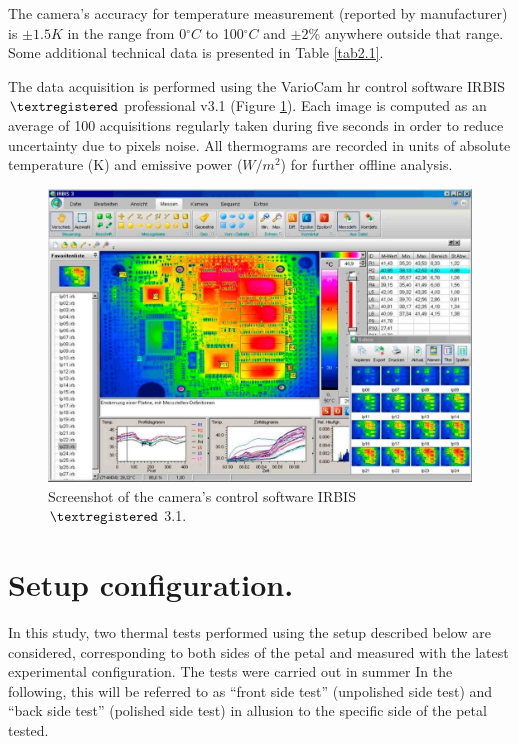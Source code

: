 		The camera’s accuracy for temperature measurement (reported by manufacturer) is $\pm 1.5 K$ in the range from 0\space$^\circ C$ to 100\space$^\circ C$ and $\pm2$\% anywhere outside that range. Some additional technical data is presented in Table \ref{tab2.1}.
		
		The data acquisition is performed using the VarioCam hr control software IRBIS $\textregistered$ professional v3.1 (Figure \ref{fig2.6}). Each image is computed as an average of 100 acquisitions regularly taken during five seconds in order to reduce uncertainty due to pixels noise. All thermograms are recorded in units of absolute temperature (K) and emissive power ($W/m^2$) for further offline analysis.
		
		\begin{figure}[ht!]
			\centering
			\captionsetup{justification=centering,margin=2cm}
			\includegraphics[scale=0.25]{Figures/Chapter02/IRBISimage.jpg}
			\caption{Screenshot of the camera’s control software IRBIS $\textregistered$ 3.1.}\label{fig2.6}
		\end{figure}\bigskip
		
	\section{Setup configuration.}\label{section2.4}
	
		In this study, two thermal tests performed using the setup described below are considered, corresponding to both sides of the petal and measured with the latest experimental configuration. 
		The tests were carried out in summer 
		In the following, this will be referred to as “front side test” (unpolished side test) and “back side test” (polished side test) in allusion to the specific side of the petal tested. 
		
